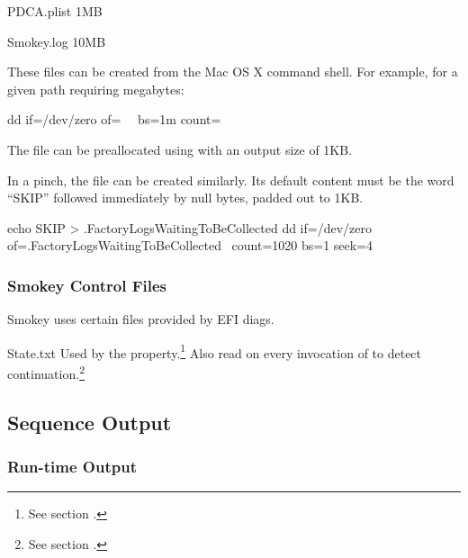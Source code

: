 \begin{Descriptive}

	\item[PDCA.plist] 1MB

	\item[Smokey.log] 10MB

\end{Descriptive}

These files can be created from the Mac OS X command shell.  For example, for a
given  path requiring  megabytes:

\begin{CommandLine}
dd if=/dev/zero of=~~ bs=1m count=~~
\end{CommandLine}

The  file can be preallocated using  with
an output size of 1KB.

In a pinch, the  file can be created
similarly.  Its default content must be the word ``SKIP'' followed immediately
by null bytes, padded out to 1KB.

\begin{CommandLine}
echo SKIP > .FactoryLogsWaitingToBeCollected
dd if=/dev/zero of=.FactoryLogsWaitingToBeCollected \
	count=1020 bs=1 seek=4
\end{CommandLine}

\subsubsection{Smokey Control Files}

Smokey uses certain files provided by EFI diags.

\begin{Definition}

	\item[State.txt] Used by the 
	property.\footnote{See section .}  Also
	read on every invocation of \cmdline{smokey} to detect
	continuation.\footnote{See section .}

\end{Definition}

\subsection{Sequence Output}
\label{sec:SeqOut}

\subsubsection{Run-time Output}

